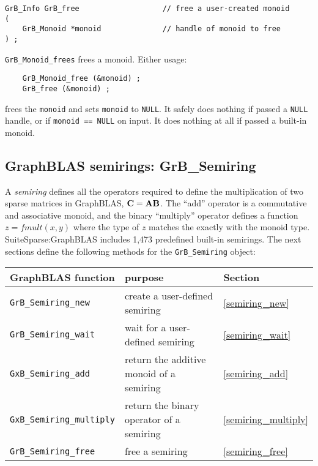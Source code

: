 \documentclass[12pt]{article}
\begin{document}
\begin{mdframed}[userdefinedwidth=6in]
{\footnotesize
\begin{verbatim}
GrB_Info GrB_free                   // free a user-created monoid
(
    GrB_Monoid *monoid              // handle of monoid to free
) ;
\end{verbatim}
} \end{mdframed}

\verb'GrB_Monoid_frees' frees a monoid.  Either usage:

    {\small
    \begin{verbatim}
    GrB_Monoid_free (&monoid) ;
    GrB_free (&monoid) ; \end{verbatim}}

\noindent
frees the \verb'monoid' and sets \verb'monoid' to \verb'NULL'.  It safely does
nothing if passed a \verb'NULL' handle, or if \verb'monoid == NULL' on input.
It does nothing at all if passed a built-in monoid.

\newpage
\subsection{GraphBLAS semirings: {\sf GrB\_Semiring}} %
\label{semiring}

A {\em semiring} defines all the operators required to define the
multiplication of two sparse matrices in GraphBLAS, ${\bf C=AB}$.  The ``add''
operator is a commutative and associative monoid, and the binary ``multiply''
operator defines a function $z=fmult(x,y)$ where the type of $z$ matches the
exactly with the monoid type.  SuiteSparse:GraphBLAS includes 1,473 predefined
built-in semirings.  The next sections define the following methods for the
\verb'GrB_Semiring' object:

\vspace{0.2in}
{\footnotesize
\begin{tabular}{lll}
GraphBLAS function   & purpose                                      & Section \\
\hline
\verb'GrB_Semiring_new'       & create a user-defined semiring           & \ref{semiring_new} \\
\verb'GrB_Semiring_wait'      & wait for a user-defined semiring         & \ref{semiring_wait} \\
\verb'GxB_Semiring_add'       & return the additive monoid of a semiring & \ref{semiring_add} \\
\verb'GxB_Semiring_multiply'  & return the binary operator of a semiring & \ref{semiring_multiply} \\
\verb'GrB_Semiring_free'      & free a semiring                          & \ref{semiring_free} \\
\hline
\end{tabular}
}
\end{document}
